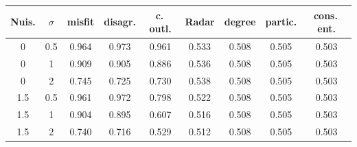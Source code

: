 \begin{tabular}{@{}cc ccccccc@{}}
\toprule
Nuis. & $\sigma$ & misfit & disagr. & c.\,outl. & Radar & degree & partic. & cons.\,ent.\\
\midrule
0 & 0.5 & 0.964 & 0.973 & 0.961 & 0.533 & 0.508 & 0.505 & 0.503 \\
0 & 1 & 0.909 & 0.905 & 0.886 & 0.536 & 0.508 & 0.505 & 0.503 \\
0 & 2 & 0.745 & 0.725 & 0.730 & 0.538 & 0.508 & 0.505 & 0.503 \\
\midrule
1.5 & 0.5 & 0.961 & 0.972 & 0.798 & 0.522 & 0.508 & 0.505 & 0.503 \\
1.5 & 1 & 0.904 & 0.895 & 0.607 & 0.516 & 0.508 & 0.505 & 0.503 \\
1.5 & 2 & 0.740 & 0.716 & 0.529 & 0.512 & 0.508 & 0.505 & 0.503 \\
\bottomrule
\end{tabular}
